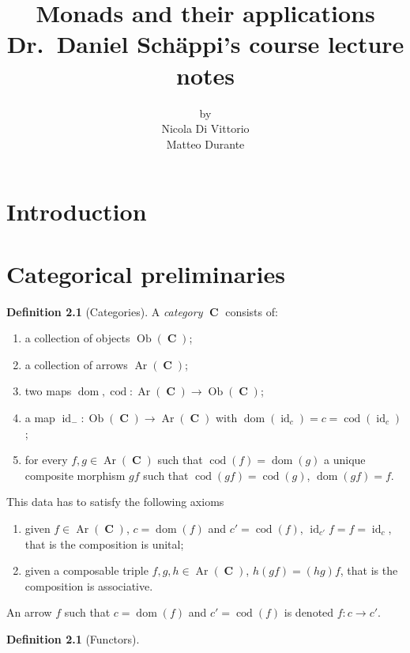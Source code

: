\documentclass[a4paper,11pt,twoside, openany]{book}
\DeclareMathOperator{\C}{\mathbf{C}}
\DeclareMathOperator{\id}{id}
\DeclareMathOperator{\dom}{dom}
\DeclareMathOperator{\cod}{cod}
\DeclareMathOperator{\Ob}{Ob}
\DeclareMathOperator{\Ar}{Ar}
\theoremstyle{definition}
\theoremstyle{definition}
\newtheorem{defn}[thm]{Definition} %
\theoremstyle{remark}
\begin{document}
	
	\author{by \\
		Nicola Di Vittorio \\ Matteo Durante}
	\title{\huge Monads and their applications \\
		\vspace*{5mm}
		\large Dr.\ Daniel Schäppi's course lecture notes} 
	\date{}
	
	\frontmatter
	\maketitle
	\tableofcontents
	
	\chapter{Introduction}
	
	\mainmatter
	
	\chapter{Categorical preliminaries}
	\begin{defn}[Categories]
		A \emph{category} $\C$ consists of:
		\begin{enumerate}
			\item a collection of objects $\Ob(\C)$;
			\item a collection of arrows $\Ar(\C)$;
			\item two maps $\dom,\cod\colon\Ar(\C)\rightarrow\Ob(\C)$;
			\item a map $\id_{-}\colon\Ob(\C)\rightarrow\Ar(\C)$ with $\dom(\id_{c})=c=\cod(\id_{c})$;
			\item for every $f,g\in\Ar(\C)$ such that $\cod(f)=\dom(g)$ a unique composite morphism $gf$ such that $\cod(gf)=\cod(g)$, $\dom(gf)=f$.
		\end{enumerate}
		This data has to satisfy the following axioms
		\begin{enumerate}
			\item given $f\in\Ar(\C)$, $c=\dom(f)$ and $c'=\cod(f)$, $\id_{c'}f=f=\id_{c}$, that is the composition is unital;
			\item given a composable triple $f,g,h\in\Ar(\C)$, $h(gf)=(hg)f$, that is the composition is associative.
		\end{enumerate}
		An arrow $f$ such that $c=\dom(f)$ and $c'=\cod(f)$ is denoted $f\colon c\rightarrow c'$.
	\end{defn}
	
	\begin{defn}[Functors]
		
	\end{defn}
	
\end{document}
